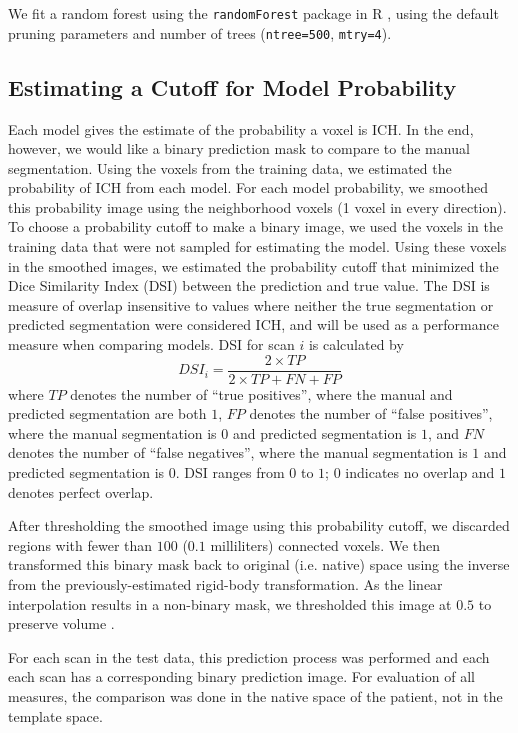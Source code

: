 \documentclass{elsarticle_nonatbib}\usepackage[]{graphicx}\usepackage[]{color}
\newcommand{\pkg}[1]{\texttt{#1}}
\newcommand{\code}[1]{\texttt{#1}}
\begin{document}
We fit a random forest \citep{breiman2001random} using the \pkg{randomForest} package in R \citep{randomForest}, using the default pruning parameters and number of trees (\code{ntree=500}, \code{mtry=4}). 



\subsection{Estimating a Cutoff for Model Probability}

Each model gives the estimate of the probability a voxel is ICH.  In the end, however, we would like a binary prediction mask to compare to the manual segmentation. 
Using the voxels from the training data, we estimated the probability of ICH from each model.  For each model probability, we smoothed this probability image using the neighborhood voxels (1 voxel in every direction).  To choose a probability cutoff to make a binary image, we used the voxels in the training data that were not sampled for estimating the model.  Using these voxels in the smoothed images, we estimated the probability cutoff that minimized the Dice Similarity Index (DSI) \citep{dice_measures_1945} between the prediction and true value.  
 The DSI is measure of overlap insensitive to values where neither the true segmentation or predicted segmentation were considered ICH, and will be used as a performance measure when comparing models.  DSI for scan $i$ is calculated by 
 $$
 DSI_i = \frac{2 \times TP}{2\times TP + FN + FP}
 $$
 where $TP$ denotes the number of ``true positives'', where the manual and predicted segmentation are both $1$, $FP$ denotes the number of ``false positives'', where the manual segmentation is $0$ and predicted segmentation is $1$, and $FN$ denotes the number of ``false negatives'', where the manual segmentation is $1$ and predicted segmentation is $0$.  DSI ranges from $0$ to $1$; $0$ indicates no overlap and $1$ denotes perfect overlap.

After thresholding the smoothed image using this probability cutoff, we discarded regions with fewer than $100$ ($0.1$ milliliters) connected voxels.  We then transformed this binary mask back to original (i.e. native) space using the inverse from the previously-estimated rigid-body transformation.  As the linear interpolation results in a non-binary mask, we thresholded this image at $0.5$ to preserve volume \cite{flirt_reg}.  

For each scan in the test data, this prediction process was performed and each each scan has a corresponding binary prediction  image.  For evaluation of all measures, the comparison was done in the native space of the patient, not in the template space.
\end{document}
